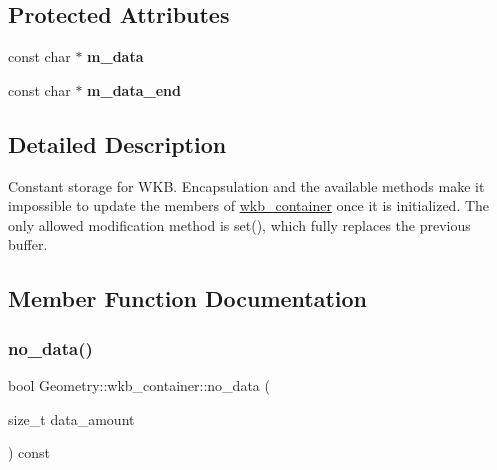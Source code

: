 \subsection*{Protected Attributes}
\begin{DoxyCompactItemize}
\item 
\mbox{\label{classGeometry_1_1wkb__container_a958ff0be5f773b8282396f84d5d996a2}} 
const char $\ast$ {\bfseries m\+\_\+data}
\item 
\mbox{\label{classGeometry_1_1wkb__container_a150128a99c8a981d9468e9dfe1608293}} 
const char $\ast$ {\bfseries m\+\_\+data\+\_\+end}
\end{DoxyCompactItemize}


\subsection{Detailed Description}
Constant storage for W\+KB. Encapsulation and the available methods make it impossible to update the members of \mbox{\hyperlink{classGeometry_1_1wkb__container}{wkb\+\_\+container}} once it is initialized. The only allowed modification method is set(), which fully replaces the previous buffer. 

\subsection{Member Function Documentation}
\mbox{\label{classGeometry_1_1wkb__container_a77f40e16781fab23d33966364f3836a2}} 
\subsubsection{\texorpdfstring{no\+\_\+data()}{no\_data()}}
{\footnotesize\ttfamily bool Geometry\+::wkb\+\_\+container\+::no\+\_\+data (\begin{DoxyParamCaption}\item[{size\+\_\+t}]{data\+\_\+amount }\end{DoxyParamCaption}) const\hspace{0.3cm}{\ttfamily [inline]}}

